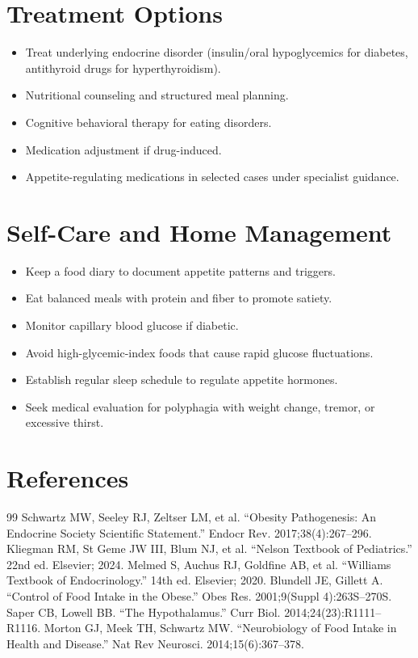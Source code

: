 \section*{Treatment Options}
\begin{itemize}
  \item Treat underlying endocrine disorder (insulin/oral hypoglycemics for diabetes, antithyroid drugs for hyperthyroidism).
  \item Nutritional counseling and structured meal planning.
  \item Cognitive behavioral therapy for eating disorders.
  \item Medication adjustment if drug-induced.
  \item Appetite-regulating medications in selected cases under specialist guidance.
\end{itemize}

\section*{Self-Care and Home Management}
\begin{itemize}
  \item Keep a food diary to document appetite patterns and triggers.
  \item Eat balanced meals with protein and fiber to promote satiety.
  \item Monitor capillary blood glucose if diabetic.
  \item Avoid high-glycemic-index foods that cause rapid glucose fluctuations.
  \item Establish regular sleep schedule to regulate appetite hormones.
  \item Seek medical evaluation for polyphagia with weight change, tremor, or excessive thirst.
\end{itemize}

\section*{References}
\begin{thebibliography}{99}
 Schwartz MW, Seeley RJ, Zeltser LM, et al. ``Obesity Pathogenesis: An Endocrine Society Scientific Statement.'' Endocr Rev. 2017;38(4):267--296.
 Kliegman RM, St Geme JW III, Blum NJ, et al. ``Nelson Textbook of Pediatrics.'' 22nd ed. Elsevier; 2024.
 Melmed S, Auchus RJ, Goldfine AB, et al. ``Williams Textbook of Endocrinology.'' 14th ed. Elsevier; 2020.
 Blundell JE, Gillett A. ``Control of Food Intake in the Obese.'' Obes Res. 2001;9(Suppl 4):263S--270S.
 Saper CB, Lowell BB. ``The Hypothalamus.'' Curr Biol. 2014;24(23):R1111--R1116.
 Morton GJ, Meek TH, Schwartz MW. ``Neurobiology of Food Intake in Health and Disease.'' Nat Rev Neurosci. 2014;15(6):367--378.
\end{thebibliography}
